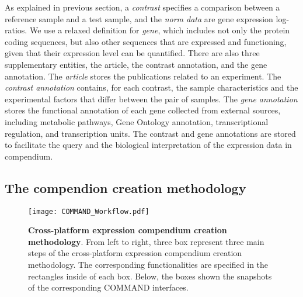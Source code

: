 %
As explained in previous section, a \textit{contrast} specifies a comparison
between a reference sample and a test sample, and the \textit{norm data} are
gene expression log-ratios.
%
We use a relaxed definition for \textit{gene}, which includes not only the
protein coding sequences, but also other sequences that are expressed and
functioning, given that their expression level can be quantified.
%
There are also three supplementary entities, the article, the contrast
annotation, and the gene annotation.
%
The \textit{article} stores the publications related to an experiment.
%
The \textit{contrast annotation} contains, for each contrast, the sample
characteristics and the experimental factors that differ between the pair of
samples.
%
The \textit{gene annotation} stores the functional annotation of each gene
collected from external sources, including metabolic pathways, Gene Ontology
annotation, transcriptional regulation, and transcription units.
%
The contrast and gene annotations are stored to facilitate the query and the
biological interpretation of the expression data in compendium.






\subsection{The compendion creation methodology}
\label{sec:colombos-comp-method}

\begin{figure}
  \centering
  \texttt{[image: COMMAND\_Workflow.pdf]}
  \caption[Cross-platform expression compendium creation methodology]{
    \textbf{Cross-platform expression compendium creation methodology}.  From
    left to right, three box represent three main steps of the cross-platform
    expression compendium creation methodology.  The corresponding
    functionalities are specified in the rectangles inside of each box.
    Below, the boxes shown the snapshots of the corresponding COMMAND
    interfaces.}
  \label{fig:command-workflow}
\end{figure}


